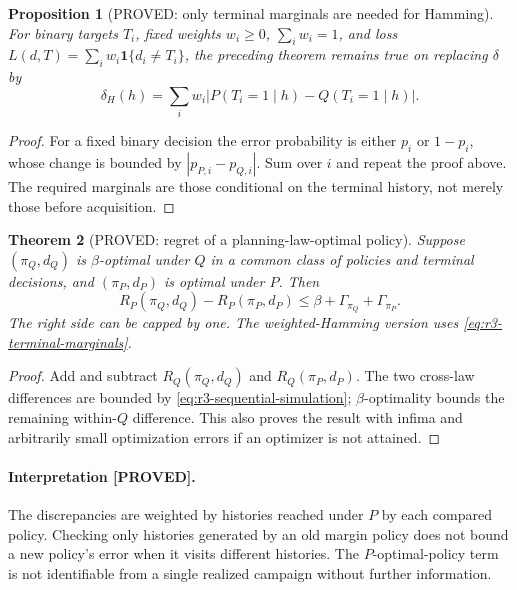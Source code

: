 \documentclass[11pt]{article}
\newtheorem{theorem}{Theorem}[section]
\newtheorem{proposition}[theorem]{Proposition}
\theoremstyle{definition}
\theoremstyle{remark}
\begin{document}
\begin{proposition}[PROVED: only terminal marginals are needed for Hamming]
For binary targets $T_i$, fixed weights $w_i\geq0$, $\sum_iw_i=1$, and
loss $L(d,T)=\sum_iw_i\mathbf{1}\{d_i\ne T_i\}$, the preceding theorem
remains true on replacing $\delta$ by
\begin{equation}
 \delta_H(h)=\sum_iw_i
 \left|P(T_i=1\mid h)-Q(T_i=1\mid h)\right|.
 \label{eq:r3-terminal-marginals}
\end{equation}
\end{proposition}
\begin{proof}
For a fixed binary decision the error probability is either $p_i$ or
$1-p_i$, whose change is bounded by $|p_{P,i}-p_{Q,i}|$.  Sum over $i$ and
repeat the proof above.  The required marginals are those conditional on
the terminal history, not merely those before acquisition.
\end{proof}

\begin{theorem}[PROVED: regret of a planning-law-optimal policy]
Suppose $(\pi_Q,d_Q)$ is $\beta$-optimal under $Q$ in a common class of
policies and terminal decisions, and $(\pi_P,d_P)$ is optimal under $P$.
Then
\begin{equation}
 R_P(\pi_Q,d_Q)-R_P(\pi_P,d_P)
 \leq\beta+\Gamma_{\pi_Q}+\Gamma_{\pi_P}.
 \label{eq:r3-sequential-regret}
\end{equation}
The right side can be capped by one.  The weighted-Hamming version uses
\eqref{eq:r3-terminal-marginals}.
\end{theorem}
\begin{proof}
Add and subtract $R_Q(\pi_Q,d_Q)$ and $R_Q(\pi_P,d_P)$.  The two
cross-law differences are bounded by
\eqref{eq:r3-sequential-simulation}; $\beta$-optimality bounds the remaining
within-$Q$ difference.  This also proves the result with infima and
arbitrarily small optimization errors if an optimizer is not attained.
\end{proof}

\paragraph{Interpretation [PROVED].}
The discrepancies are weighted by histories reached under $P$ by each
compared policy.  Checking only histories generated by an old margin
policy does not bound a new policy's error when it visits different
histories.  The $P$-optimal-policy term is not identifiable from a single
realized campaign without further information.
\end{document}

